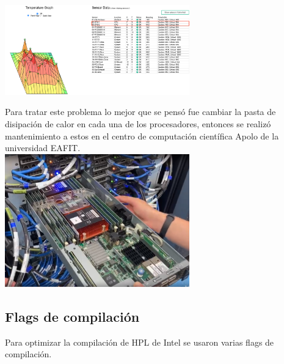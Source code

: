 \documentclass[conference,compsoc]{IEEEtran}
\begin{document}
\includegraphics[width=8cm]{Temperatura.png}

Para tratar este problema lo mejor que se pensó fue cambiar la pasta de disipación de calor en cada una de los procesadores, entonces se realizó mantenimiento a estos en el centro de computación científica Apolo de la universidad EAFIT.\\


\includegraphics[width=8cm]{Compute-1-1.png}

\subsection{Flags de compilación}
Para optimizar la compilación de HPL de Intel se usaron varias flags de compilación.
\end{document}
